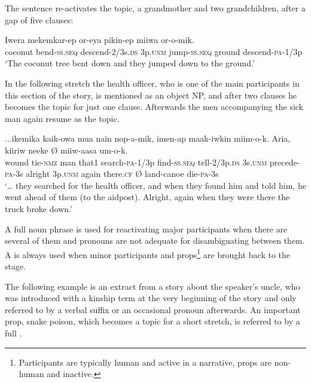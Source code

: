 The sentence  re-activates the topic, a grandmother and two grandchildren, after a gap of five clauses:

\ea%
\label{ex:x1923}
\gll Iwera  mekemkar-ep  or-eya    pikin-ep miiwa  or-o-mik. \\
coconut  bend-\textsc{ss}.\textsc{seq}  descend-2/3s.\textsc{ds}  3p.\textsc{unm}  jump-\textsc{ss}.\textsc{seq} ground  descend-\textsc{pa}-1/3p     \\
\glt`The coconut tree bent down and they jumped down to the ground.'
\z


In the following stretch the health officer, who is one of the main participants in this section of the story, is mentioned as an object NP, and after two clauses he becomes the topic for just one clause. Afterwards the men accompanying the sick man again resume as the topic. 

\ea%
\label{ex:x1924}
\gll ...ikemika  kaik-owa  mua  nain  nop-a-mik,  imen-ap maak-iwkin    miim-o-k.  Aria,    kiiriw  neeke {\O}  miiw-aasa  um-o-k.\\
wound  tie-\textsc{nmz}  man  that1  search-\textsc{pa}-1/3p  find-\textsc{ss}.\textsc{seq} tell-2/3p.\textsc{ds}  3s.\textsc{unm}  precede-\textsc{pa}-3s  alright  3p.\textsc{unm}  again  there.\textsc{cf} {\O}  land-canoe  die-\textsc{pa}-3s\\
\glt`{\dots} they searched for the health officer, and when they found him and told him, he went ahead of them (to the aidpost). Alright, again when they were there the truck broke down.'
\z


A full noun phrase is used for reactivating major participants when there are several of them and pronouns are not adequate for disambiguating between them. A  is always used when minor participants and props\footnote{Participants are typically human and active in a narrative, props are non-human and inactive. }  are brought back to the stage. 

The following example is an extract from a story about the speaker's uncle, who was introduced with a kinship term at the very beginning of the story and only referred to by a verbal suffix or an occasional pronoun afterwards. An  important prop, snake poison, which becomes a topic for a short stretch, is referred to by a full .

